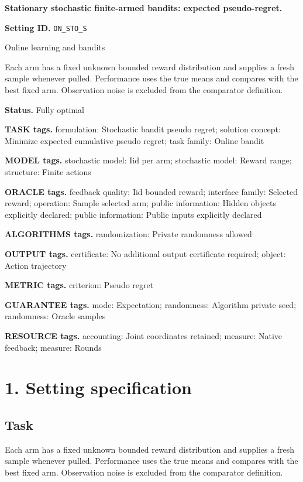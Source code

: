 \documentclass[10pt,a4paper]{article}
\begin{document}
\raggedright

{\LARGE\bfseries\sffamily\color{AtlasNavy} Stationary stochastic finite-armed bandits: expected pseudo-regret.\par}\vspace{5pt}
\textbf{Setting ID.} \texttt{ON\_\allowbreak{}STO\_\allowbreak{}S}

Online learning and bandits

Each arm has a fixed unknown bounded reward distribution and supplies a fresh sample whenever pulled. Performance uses the true means and compares with the best fixed arm. Observation noise is excluded from the comparator definition.

\textbf{Status.} Fully optimal

\textbf{TASK tags.} formulation: Stochastic bandit pseudo regret; solution concept: Minimize expected cumulative pseudo regret; task family: Online bandit

\textbf{MODEL tags.} stochastic model: Iid per arm; stochastic model: Reward range; structure: Finite actions

\textbf{ORACLE tags.} feedback quality: Iid bounded reward; interface family: Selected reward; operation: Sample selected arm; public information: Hidden objects explicitly declared; public information: Public inputs explicitly declared

\textbf{ALGORITHMS tags.} randomization: Private randomness allowed

\textbf{OUTPUT tags.} certificate: No additional output certificate required; object: Action trajectory

\textbf{METRIC tags.} criterion: Pseudo regret

\textbf{GUARANTEE tags.} mode: Expectation; randomness: Algorithm private seed; randomness: Oracle samples

\textbf{RESOURCE tags.} accounting: Joint coordinates retained; measure: Native feedback; measure: Rounds

\section{1. Setting specification}
\subsection{Task}
Each arm has a fixed unknown bounded reward distribution and supplies a fresh sample whenever pulled. Performance uses the true means and compares with the best fixed arm. Observation noise is excluded from the comparator definition.
\end{document}
